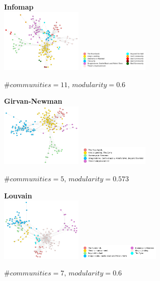 \documentclass[10pt,twocolumn,letterpaper]{article}
\begin{document}
\begin{figure}[!h]
    \centering
    \textbf{Infomap}  \\
    \includegraphics[width=0.35\textwidth]{img/s4/communities_infomap.jpg}
    \includegraphics[width=0.3\textwidth]{img/s4/infomap_legend.jpg}\\
    \caption{\small{$\#communities=11$, $modularity=0.6$}}
    \label{fig:infomap_s4}
\end{figure}


\begin{figure}[!h]
    \centering
    \textbf{Girvan-Newman} \\
    \includegraphics[width=0.35\textwidth]{img/s4/communities_g-n.jpg}
    \includegraphics[width=0.3\textwidth]{img/s4/g-n_legend.jpg}\\
    \caption{\small{$\#communities=5$, $modularity=0.573$}}
    \label{fig:gn_s4}
\end{figure}


\begin{figure}[!h]
    \centering
    \textbf{Louvain} \\
    \includegraphics[width=0.35\textwidth]{img/s4/communities_louvain.jpg}
    \includegraphics[width=0.35\textwidth]{img/s4/louvain_legend.jpg}\\
    \caption{\small{$\#communities=7$, $modularity=0.6$}}
    \label{fig:louvain_s4}
\end{figure}
\end{document}
